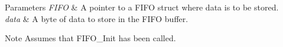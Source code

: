 \begin{DoxyParams}{Parameters}
{\em F\+I\+F\+O} & A pointer to a F\+I\+F\+O struct where data is to be stored. \\
\hline
{\em data} & A byte of data to store in the F\+I\+F\+O buffer.\\
\hline
\end{DoxyParams}
\begin{DoxyNote}{Note}
Assumes that F\+I\+F\+O\+\_\+\+Init has been called. 
\end{DoxyNote}
